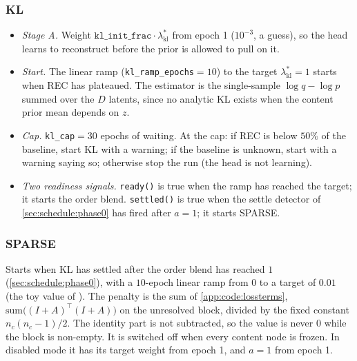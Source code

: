 \subsubsection{KL}
\begin{itemize}[leftmargin=1.5em]
\item \emph{Stage A.} Weight $\texttt{kl\_init\_frac}\cdot\lambda_{\mathrm{kl}}^{\ast}$
      from epoch 1 ($10^{-3}$, a guess), so the head learns to reconstruct before the
      prior is allowed to pull on it.
\item \emph{Start.} The linear ramp (\texttt{kl\_ramp\_epochs}$=10$) to the target
      $\lambda_{\mathrm{kl}}^{\ast}=1$ starts when REC has plateaued. The estimator is
      the single-sample $\log q-\log p$ summed over the $D$ latents, since no analytic
      KL exists when the content prior mean depends on $z$.
\item \emph{Cap.} \texttt{kl\_cap}$=30$ epochs of waiting. At the cap: if REC is below
      $50\%$ of the baseline, start KL with a warning; if the baseline is unknown,
      start with a warning saying so; otherwise stop the run (the head is not
      learning).
\item \emph{Two readiness signals.} \texttt{ready()} is true when the ramp has reached
      the target; it starts the order blend. \texttt{settled()} is true when the
      settle detector of \cref{sec:schedule:phase0} has fired after $a=1$; it starts
      SPARSE.
\end{itemize}

\subsubsection{SPARSE}
Starts when KL has settled after the order blend has reached $1$
(\cref{sec:schedule:phase0}), with a $10$-epoch linear ramp from $0$ to a target of
$0.01$ (the toy value of \cite{ngimpl}). The penalty is the sum of
\cref{app:code:lossterms}, $\mathrm{sum}\bigl((I+A)^\top(I+A)\bigr)$ on the unresolved
block, divided by the fixed constant $n_c(n_c-1)/2$. The identity part is not
subtracted, so the value is never $0$ while the block is non-empty. It is switched off
when every content node is frozen. In disabled mode it has its target weight from
epoch 1, and $a=1$ from epoch 1.


